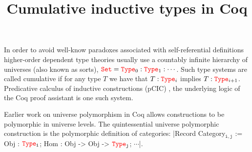 \documentclass{easychair}
\title{Cumulative inductive types in Coq}
\author{
}
\institute{
 }
\newcommand{\Type}[1]{{\color{red} \mathtt{Type}}_{#1}}
\newcommand{\Set}{{\color{red} \mathtt{Set}}}
\begin{document}
\maketitle

In order to avoid well-know paradoxes associated with self-referential
definitions higher-order dependent type theories usually use a
countably infinite hierarchy of universes (also known as sorts),
$\Set = \Type{0} : \Type{1} : \cdots$. Such type systems are called
cumulative if for any type $T$ we have that $T : \Type{i}$ implies
$T : \Type{i+1}$. Predicative calculus of inductive constructions
(pCIC) \cite{coq, DBLP:journals/corr/abs-1111-0123}, the underlying logic of the Coq proof assistant is one such
system.

Earlier work \cite{DBLP:conf/itp/SozeauT14} on universe polymorphism
in Coq allows constructions to be polymorphic in universe levels.  The
quintessential universe polymorphic construction is the polymorphic definition of
categories:
\Coqe|Record Category$_{\mathtt{i, j}}$ := {Obj : $\Type{\mathtt{i}}$; Hom : Obj -> Obj -> $\Type{\mathtt{j}}$; $\cdots$}|.\footnotemark{}
\end{document}

